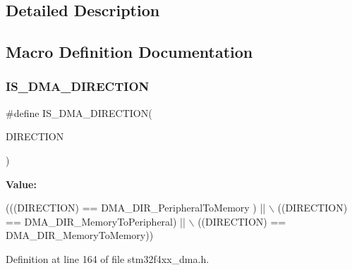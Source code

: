 \subsection{Detailed Description}


\subsection{Macro Definition Documentation}
\mbox{\label{group___d_m_a__data__transfer__direction_gae2b02e8e823854bcd7c5746cdd29e70d}} 
\subsubsection{\texorpdfstring{I\+S\+\_\+\+D\+M\+A\+\_\+\+D\+I\+R\+E\+C\+T\+I\+ON}{IS\_DMA\_DIRECTION}}
{\footnotesize\ttfamily \#define I\+S\+\_\+\+D\+M\+A\+\_\+\+D\+I\+R\+E\+C\+T\+I\+ON(\begin{DoxyParamCaption}\item[{}]{D\+I\+R\+E\+C\+T\+I\+ON }\end{DoxyParamCaption})}

{\bfseries Value\+:}
\begin{DoxyCode}
(((DIRECTION) == DMA\_DIR\_PeripheralToMemory ) || \(\backslash\)
                                     ((DIRECTION) == DMA\_DIR\_MemoryToPeripheral)  || \(\backslash\)
                                     ((DIRECTION) == DMA\_DIR\_MemoryToMemory))
\end{DoxyCode}


Definition at line 164 of file stm32f4xx\+\_\+dma.\+h.


